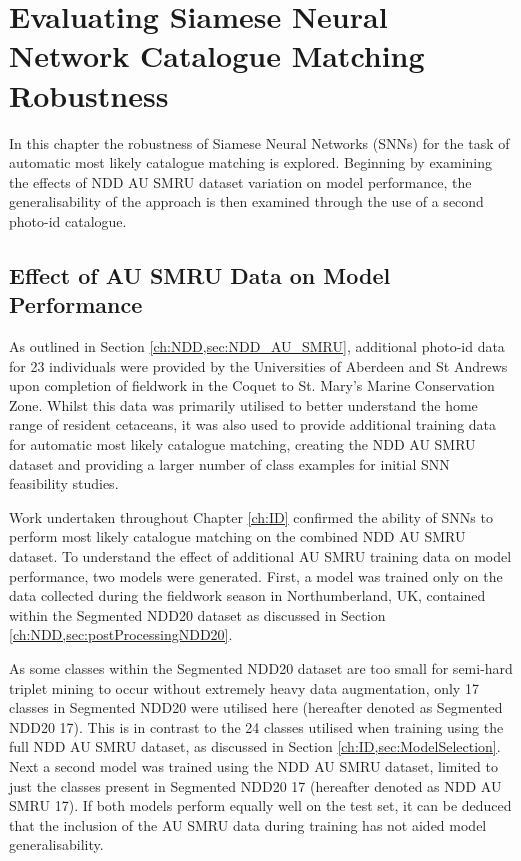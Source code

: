 \chapter{Evaluating Siamese Neural Network Catalogue Matching Robustness}\label{ch:SNNEvaluation}

In this chapter the robustness of Siamese Neural Networks (SNNs) for the task of automatic most likely catalogue matching is explored. Beginning by examining the effects of NDD AU SMRU dataset variation on model performance, the generalisability of the approach is then examined through the use of a second photo-id catalogue. 

\section{Effect of AU SMRU Data on Model Performance}\label{ch:SNNEvaluation,sec:EffectOfAUSMRU}

As outlined in Section \ref{ch:NDD,sec:NDD_AU_SMRU}, additional photo-id data for 23 individuals were provided by the Universities of Aberdeen and St Andrews upon completion of fieldwork in the Coquet to St. Mary's Marine Conservation Zone. Whilst this data was primarily utilised to better understand the home range of resident cetaceans, it was also used to provide additional training data for automatic most likely catalogue matching, creating the NDD AU SMRU dataset and providing a larger number of class examples for initial SNN feasibility studies. 

Work undertaken throughout Chapter \ref{ch:ID} confirmed the ability of SNNs to perform most likely catalogue matching on the combined NDD AU SMRU dataset. To understand the effect of additional AU SMRU training data on model performance, two models were generated. First, a model was trained only on the data collected during the fieldwork season in Northumberland, UK, contained within the Segmented NDD20 dataset as discussed in Section \ref{ch:NDD,sec:postProcessingNDD20}. 

As some classes within the Segmented NDD20 dataset are too small for semi-hard triplet mining to occur without extremely heavy data augmentation, only 17 classes in Segmented NDD20 were utilised here (hereafter denoted as Segmented NDD20 17). This is in contrast to the 24 classes utilised when training using the full NDD AU SMRU dataset, as discussed in Section \ref{ch:ID,sec:ModelSelection}. Next a second model was trained using the NDD AU SMRU dataset, limited to just the classes present in Segmented NDD20 17 (hereafter denoted as NDD AU SMRU 17). If both models perform equally well on the test set, it can be deduced that the inclusion of the AU SMRU data during training has not aided model generalisability. 

